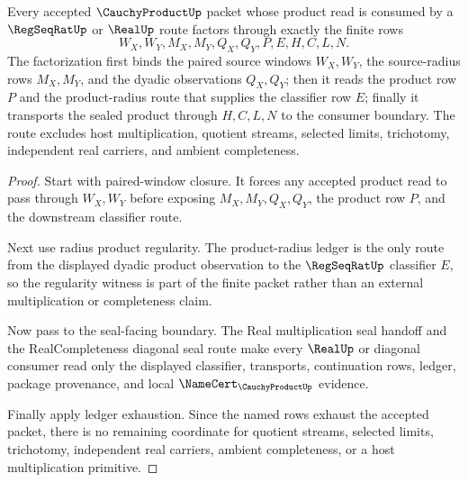\begin{theorem}
\label{thm:cauchy-product-paired-window-regularity-exhaustion}
Every accepted $\CauchyProductUp$ packet whose product read is consumed by a $\RegSeqRatUp$ or $\RealUp$ route factors through exactly the finite rows
$$
W_X,W_Y,M_X,M_Y,Q_X,Q_Y,P,E,H,C,L,N.
$$
The factorization first binds the paired source windows $W_X,W_Y$, the source-radius rows $M_X,M_Y$, and the dyadic observations $Q_X,Q_Y$; then it reads the product row $P$ and the product-radius route that supplies the classifier row $E$; finally it transports the sealed product through $H,C,L,N$ to the consumer boundary. The route excludes host multiplication, quotient streams, selected limits, trichotomy, independent real carriers, and ambient completeness.
\end{theorem}
\begin{proof}
Start with paired-window closure. It forces any accepted product read to pass through $W_X,W_Y$ before exposing $M_X,M_Y,Q_X,Q_Y$, the product row $P$, and the downstream classifier route.

Next use radius product regularity. The product-radius ledger is the only route from the displayed dyadic product observation to the $\RegSeqRatUp$ classifier $E$, so the regularity witness is part of the finite packet rather than an external multiplication or completeness claim.

Now pass to the seal-facing boundary. The Real multiplication seal handoff and the RealCompleteness diagonal seal route make every $\RealUp$ or diagonal consumer read only the displayed classifier, transports, continuation rows, ledger, package provenance, and local $\NameCert_{\CauchyProductUp}$ evidence.

Finally apply ledger exhaustion. Since the named rows exhaust the accepted packet, there is no remaining coordinate for quotient streams, selected limits, trichotomy, independent real carriers, ambient completeness, or a host multiplication primitive.
\end{proof}

